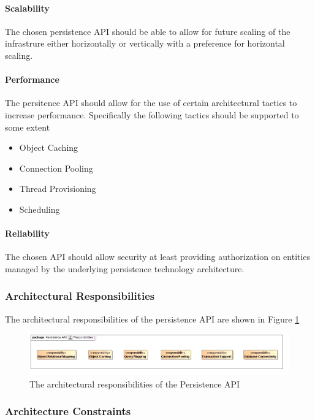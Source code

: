\paragraph{Scalability}
The chosen persistence API should be able to allow for future scaling of the
infrastrure either horizontally or vertically with a preference for 
horizontal scaling.

\paragraph{Performance}
The persitence API should allow for the use of certain architectural tactics
to increase performance. Specifically the following tactics should be supported
to some extent
\begin{itemize}
	\item Object Caching
	\item Connection Pooling
	\item Thread Provisioning
	\item Scheduling
\end{itemize}

\paragraph{Reliability}
The chosen API should allow security at least providing authorization on
entities managed by the underlying persistence technology architecture.

\subsubsection{Architectural Responsibilities}
The architectural responsibilities of the persistence API are shown in 
Figure \ref{fig:persistenceResponsibilities}
\begin{figure}[H]
	\begin{center}
	\includegraphics[scale=0.5]{../Diagrams and Charts/Persistence API/Responsibilities.jpg}
	\caption{The architectural responsibilities of the Persistence API}
	\label{fig:persistenceResponsibilities}
	\end{center}
\end{figure}

\subsubsection{Architecture Constraints}
